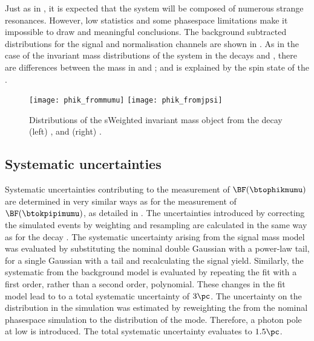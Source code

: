 Just as in \kpipi, it is expected that the \phik system will be composed of numerous strange
resonances.
However, low statistics and some phasespace limitations make it impossible to draw and meaningful
conclusions.
The background subtracted \phik distributions for the signal and normalisation channels are shown
in .
As in the case of the invariant mass distributions of the \kpipi system in the decays \btokpipimumu
and \btojpsikpipi, there are differences between the \phik mass in \btophikmumu and \btojpsiphik;
and is explained by the spin state of the \jpsi.

\begin{figure}
  \begin{center}
    \texttt{[image: phik\_frommumu]}
    \texttt{[image: phik\_fromjpsi]}
    \caption[Invariant mass distributions of \phik in data]
    {
      Distributions of the sWeighted invariant mass \phik object from the decay
      (left) \btophikmumu, and
      (right) \btojpsiphik.
    }
    \label{fig:phik:phik}
  \end{center}
\end{figure}






\subsection{Systematic uncertainties}
\label{ssec:phik:syst}

Systematic uncertainties contributing to the measurement of $\BF(\btophikmumu)$ are determined in
very similar ways as for the measurement of $\BF(\btokpipimumu)$, as detailed in
.
The uncertainties introduced by correcting the simulated events by weighting and resampling are
calculated in the same way as for the decay \btokpipimumu.
The systematic uncertainty arising from the signal mass model was evaluated by
substituting the nominal double Gaussian with a power-law tail, for a single Gaussian with a tail
and recalculating the signal yield.
Similarly, the systematic from the background model is evaluated by repeating the fit with a first
order, rather than a second order, polynomial.
These changes in the fit model lead to to a total systematic uncertainty of \approx$3\pc$.
The uncertainty on the \qsq distribution in the simulation was estimated by reweighting the from
the nominal phasespace simulation to the distribution of the  mode.
Therefore, a photon pole at low \qsq is introduced.
The total systematic uncertainty evaluates to \approx$1.5\pc$.

